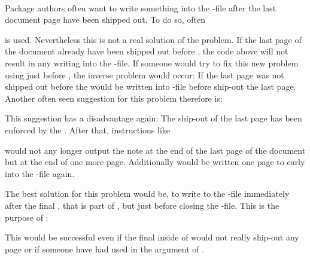 \begin{Declaration}
  \\
\end{Declaration}%
%
%
Package authors often want to write something into the -file after
the last document page have been shipped out. To do so, often
\begin{lstcode}[belowskip=\dp\strutbox]
  \AtEndDocument{%
    \if@filesw
      \write\@auxout{%
        \protect\writethistoaux%
      }%
    \fi
  } 
\end{lstcode}
is used. Nevertheless this is not a real solution of the problem. If the last
page of the document already have been shipped out before
, the code above will not result in any
writing into the -file. If someone would try to fix this new problem
using  just before , the inverse problem would
occur: If the last page was not shipped out before
 the  would be written
into -file before ship-out the last page. Another often seen
suggestion for this problem therefore is:
\begin{lstcode}[belowskip=\dp\strutbox]
  \AtEndDocument{%
    \if@filesw
      \clearpage
      \immediate\write\@auxout{%
        \protect\writethistoaux%
      }%
    \fi
  } 
\end{lstcode}
This suggestion has a disadvantage again: The ship-out of the last page has
been enforced by the . After that, instructions like
\begin{lstcode}[belowskip=\dp\strutbox]
\end{lstcode}
would not any longer output the note at the end of the last page of the
document but at the end of one more page. Additionally 
would be written one page to early into the -file again.

The best solution for this problem would be, to write to the -file
immediately after the final , that is part of
, but just before closing the
-file. This is the purpose of :
\begin{lstcode}[belowskip=\dp\strutbox]
  \BeforeClosingMainAux{%
    \if@filesw
      \immediate\write\@auxout{%
        \protect\writethistoaux%
      }%
    \fi
  }
\end{lstcode}
This would be successful even if the final  inside of
 would not really ship-out any page or if
someone have had used  in the argument of
.

